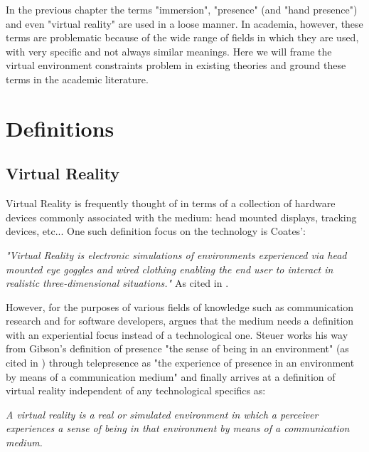 In the previous chapter the terms "immersion", "presence" (and "hand presence") and even "virtual reality" are used in a loose manner. In academia, however, these terms are problematic because of the wide range of fields in which they are used, with very specific and not always similar meanings. Here we will frame the virtual environment constraints problem in existing theories and ground these terms in the academic literature.

\section{Definitions}
\label{sec:definitions}

\subsection{Virtual Reality}
\label{subsec:vrDef}

Virtual Reality is frequently thought of in terms of a collection of hardware devices commonly associated with the medium: head mounted displays, tracking devices, etc... One such definition focus on the technology is Coates':

\begin{displayquote}
\textit{"Virtual Reality is electronic simulations of environments experienced via head mounted eye goggles and wired clothing enabling the end user to interact in realistic three-dimensional situations."} As cited in \parencite{Steuer1992}.
\end{displayquote}

However, for the purposes of various fields of knowledge such as communication research and for software developers, \parencite{Steuer1992} argues that the medium needs a definition with an experiential focus instead of a technological one. Steuer works his way from Gibson's definition of presence "the sense of being in an environment" (as cited in \parencite{Steuer1992}) through telepresence as "the experience of presence in an environment by means of a communication medium" \parencite{Steuer1992} and finally arrives at a definition of virtual reality independent of any technological specifics as:

\begin{displayquote}
\textit{A virtual reality is a real or simulated environment in which a perceiver experiences a sense of being in that environment by means of a communication medium.} \parencite{Steuer1992}
\end{displayquote}

